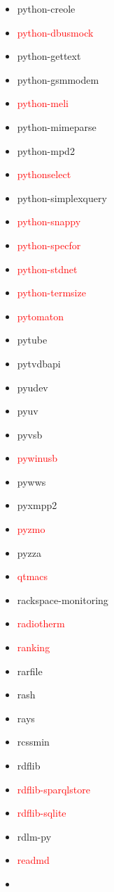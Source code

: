 \documentclass{l4proj}
\begin{document}
\begin{appendices}
{\begin{itemize}
\item python-creole
\item\textcolor{red}{python-dbusmock}
\item python-gettext
\item python-gsmmodem
\item\textcolor{red}{python-meli}
\item python-mimeparse
\item python-mpd2
\item\textcolor{red}{pythonselect}
\item python-simplexquery
\item\textcolor{red}{python-snappy}
\item\textcolor{red}{python-specfor}
\end{itemize}
}%
\noindent\parbox[t]{0.32\textwidth}{\raggedright%
\begin{itemize}
\item\textcolor{red}{python-stdnet}
\item\textcolor{red}{python-termsize}
\item\textcolor{red}{pytomaton}
\item pytube
\item pytvdbapi
\item pyudev
\item pyuv
\item pyvsb
\item\textcolor{red}{pywinusb}
\item pywws
\item pyxmpp2
\item\textcolor{red}{pyzmo}
\item pyzza
\item\textcolor{red}{qtmacs}
\item rackspace-monitoring
\item\textcolor{red}{radiotherm}
\item\textcolor{red}{ranking}
\item rarfile
\item rash
\item rays
\item rcssmin
\item rdflib
\item\textcolor{red}{rdflib-sparqlstore}
\item\textcolor{red}{rdflib-sqlite}
\item rdlm-py
\item\textcolor{red}{readmd}
\item\textcolor{red}{}

\end{itemize}}
\end{appendices}
\end{document}
